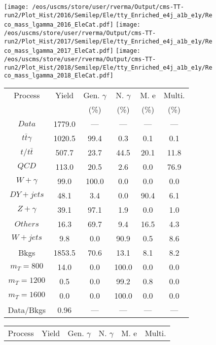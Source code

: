 \begin{figure}
\centering
\texttt{[image: /eos/uscms/store/user/rverma/Output/cms-TT-run2/Plot\_Hist/2016/Semilep/Ele/tty\_Enriched\_e4j\_a1b\_e1y/Reco\_mass\_lgamma\_2016\_EleCat.pdf]}
\texttt{[image: /eos/uscms/store/user/rverma/Output/cms-TT-run2/Plot\_Hist/2017/Semilep/Ele/tty\_Enriched\_e4j\_a1b\_e1y/Reco\_mass\_lgamma\_2017\_EleCat.pdf]}
\texttt{[image: /eos/uscms/store/user/rverma/Output/cms-TT-run2/Plot\_Hist/2018/Semilep/Ele/tty\_Enriched\_e4j\_a1b\_e1y/Reco\_mass\_lgamma\_2018\_EleCat.pdf]}
\begin{minipage}[c]{0.32\textwidth}
\centering
\tiny{
\begin{tabular}{cccccc}
\hline
Process & Yield & Gen. $\gamma$ & N. $\gamma$ & M. e & Multi. \\
 &  & (\%) & (\%) & (\%) & (\%)  \\
\hline
                                                                      $ Data $ &  1779.0 &  --- &  --- &  --- &  ---\\
$ t\bar{t}\gamma $ &  1020.5 &  99.4 &  0.3 &  0.1 &  0.1\\
$ t/t\bar{t} $ &  507.7 &  23.7 &  44.5 &  20.1 &  11.8\\
$ QCD $ &  113.0 &  20.5 &  2.6 &  0.0 &  76.9\\
$ W+\gamma $ &  99.0 &  100.0 &  0.0 &  0.0 &  0.0\\
$ DY+jets $ &  48.1 &  3.4 &  0.0 &  90.4 &  6.1\\
$ Z+\gamma $ &  39.1 &  97.1 &  1.9 &  0.0 &  1.0\\
$ Others $ &  16.3 &  69.7 &  9.4 &  16.5 &  4.3\\
$ W+jets $ &  9.8 &  0.0 &  90.9 &  0.5 &  8.6\\
Bkgs &  1853.5 &  70.6 &  13.1 &  8.1 &  8.2\\
$ m_{T} = 800 $ &  14.0 &  0.0 &  100.0 &  0.0 &  0.0\\
$ m_{T} = 1200 $ &  0.5 &  0.0 &  99.2 &  0.8 &  0.0\\
$ m_{T} = 1600 $ &  0.0 &  0.0 &  100.0 &  0.0 &  0.0\\
Data/Bkgs &  0.96 &  --- &  --- &  --- &  ---\\
\hline
\end{tabular}
}
\end{minipage}
\begin{minipage}[c]{0.32\textwidth}
\centering
\tiny{
\begin{tabular}{cccccc}
\hline
Process & Yield & Gen. $\gamma$ & N. $\gamma$ & M. e & Multi. \\

\end{tabular}}
\end{minipage}
\end{figure}
